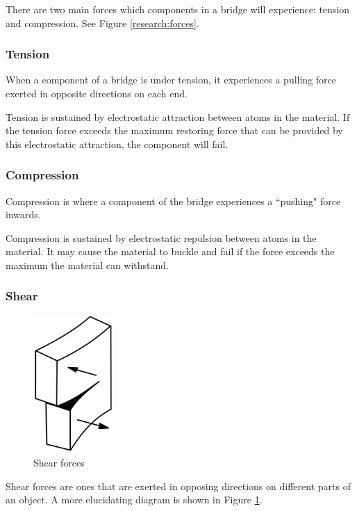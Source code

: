 \documentclass[a4paper,11pt]{article}
\begin{document}
There are two main forces which components in a bridge will experience:
tension and compression. See Figure \ref{research:forces}.


\subsubsection{Tension}

When a component of a bridge is under tension, it experiences a pulling force
exerted in opposite directions on each end.

Tension is sustained by electrostatic attraction between atoms in the material.
If the tension force exceeds the maximum restoring force that can be provided
by this electrostatic attraction, the component will fail.


\subsubsection{Compression}

Compression is where a component of the bridge experiences a ``pushing" force
inwards.

Compression is sustained by electrostatic repulsion between atoms in the
material.
It may cause the material to buckle and fail if the force exceeds the maximum
the material can withstand.


\subsubsection{Shear}

\begin{figure}
\begin{center}
\includegraphics[width=3cm]{figures/shear.png}
\end{center}
\caption{Shear forces}
\label{research:shear}
\end{figure}

Shear forces are ones that are exerted in opposing directions on different parts
of an object.
A more elucidating diagram is shown in Figure \ref{research:shear}.
\end{document}
